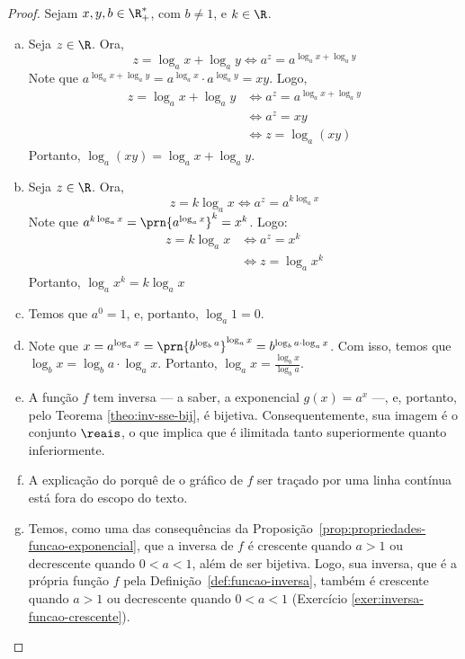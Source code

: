 \begin{proof}
	Sejam $x, y, b \in \R_+^*$, com $b \neq 1$, e $k \in \R$.
	\begin{enumerate}[(a)]
		\item 
		Seja $z \in \R$. Ora,
		\[
			z = \log_a x + \log_a y \iff a^z = a^{\log_a x + \log_a y} 
		\]
		Note que $a^{\log_a x + \log_a y}  = a^{\log_a x} \cdot a^{\log_a y} = xy$.
		Logo, 
		\begin{align*}
			z = \log_a x + \log_a y & \iff a^z = a^{\log_a x + \log_a y}\\
			& \iff a^z = xy \\
			& \iff z = \log_a(xy)
		\end{align*}
		Portanto, $\log_a(xy)=\log_a x + \log_a y$.

		\item Seja $z \in \R$.
		Ora, 
		\[
			z = k \log_a x \iff a^z = a^{k\log_a x}
		\]
		Note que $a^{k\log_a x} = \prn{a^{\log_a x}}^k = x^k$.
		Logo:
		\begin{align*}
			z = k \log_a x & \iff a^z = x^k \\ &\iff z = \log_a {x^k}
		\end{align*}
		Portanto, $\log_a{x^k}=k\log_a x$

		\item Temos que $a^0 = 1$, e, portanto, $\log_a 1 = 0$.

		\item Note que $x = a^{\log_a x} = \prn{b^{\log_b a}}^{\log_a x} = b^{\log_b a \cdot \log_a x}$.
		Com isso, temos que $\log_b x = \log_b a \cdot \log_a x$. Portanto, $\log_a x = \frac{\log_b x}{\log_b a}$.

		\item A função $f$ tem inversa --- a saber, a exponencial $g(x) =  a^x$ ---, e, portanto, pelo Teorema \ref{theo:inv-sse-bij}, é bijetiva.
		Consequentemente, sua imagem é o conjunto $\reais$, o que implica que é ilimitada tanto superiormente quanto inferiormente.

		\item A explicação do porquê de o gráfico de $f$ ser traçado por uma linha contínua está fora do escopo do texto.

		\item Temos, como uma das consequências da Proposição~\ref{prop:propriedades-funcao-exponencial}, que a inversa de $f$ é crescente
		quando $a > 1$ ou decrescente quando $0 < a <1$, além de ser bijetiva.
		Logo, sua inversa, que é a própria função $f$ pela Definição~\ref{def:funcao-inversa}, também é crescente quando $a > 1$ ou decrescente
		quando $0 < a < 1$ (Exercício \ref{exer:inversa-funcao-crescente}).


	\end{enumerate}
\end{proof}


